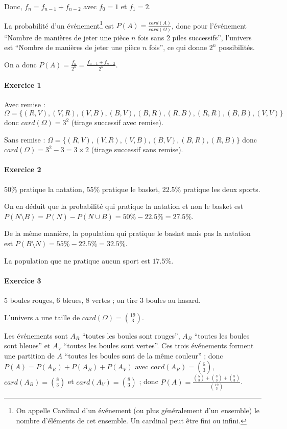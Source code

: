 \documentclass[10pt,a4paper,french]{article}
\begin{document}
Donc, $f_n = f_{n-1} + f_{n-2}$ avec $f_0 = 1$ et $f_1=2$.

La probabilité d'un événement\footnote{On appelle Cardinal d'un événement (ou plus généralement d'un ensemble) le nombre d'éléments de cet ensemble. Un cardinal peut être fini ou infini.} est $P(A)=\frac{card(A)}{card(\Omega)}$, donc pour l'événement ``Nombre de manières de jeter une pièce $n$ fois sans 2 piles successifs'', l'univers est ``Nombre de manières de jeter une pièce $n$ fois'', ce qui donne $2^n$ possibilités.

On a donc $P(A)=\frac{f_n}{2^n}=\frac{f_{n-1}+f_{n-2}}{2^n}$.

\paragraph{Exercice 1}
Avec remise : $\Omega=\lbrace(R, V), (V, R), (V, B), (B, V), (B, R), (R, B), (R, R), (B, B), (V, V)\rbrace$ donc $card(\Omega)=3^2$ (tirage successif avec remise).

Sans remise : $\Omega=\lbrace(R, V), (V, R), (V, B), (B, V), (B, R), (R, B)\rbrace$ donc $card(\Omega)=3^2-3=3 \times 2$ (tirage successif sans remise).

\paragraph{Exercice 2} 50\% pratique la natation, 55\% pratique le basket, 22.5\% pratique les deux sports.

On en déduit que la probabilité qui pratique la natation et non le basket est $P(N \setminus B) = P(N) - P(N \cup B) = 50 \% - 22.5\% = 27.5 \% $.

De la même manière, la population qui pratique le basket mais pas la natation est $P(B \setminus N)= 55\% - 22.5\% = 32.5\%$.

La population que ne pratique aucun sport est $17.5\%$.

\paragraph{Exercice 3}
5 boules rouges, 6 bleues, 8 vertes ; on tire 3 boules au hasard.

L'univers a une taille de $card(\Omega) = {19 \choose 3}$.

Les événements sont $A_R$ ``toutes les boules sont rouges'', $A_B$ ``toutes les boules sont bleues'' et $A_V$ ``toutes les boules sont vertes''.
Ces trois événements forment une partition de $A$ ``toutes les boules sont de la même couleur'' ; donc 
$P(A) = P(A_R) + P(A_B) + P(A_V)$
avec
$card(A_R)={5 \choose 3}$,
$card(A_B)={8 \choose 3}$ et
$card(A_V)={8 \choose 3}$ ; donc
$P(A)=
\frac
	{{5 \choose 3} + {8 \choose 3} + {8 \choose 3}}
	{{19 \choose 3}}
$.
\end{document}
